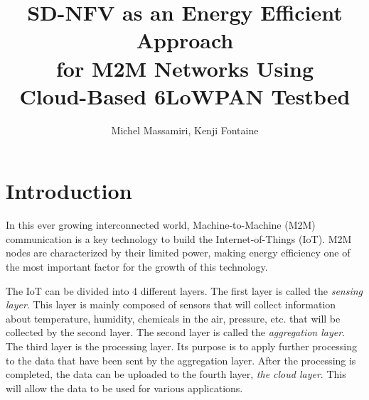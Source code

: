 \documentclass[10pt,journal,compsoc]{IEEEtran}
\begin{document}
%
\title{SD-NFV as an Energy Efficient Approach \\
       for M2M Networks Using \\
       Cloud-Based 6LoWPAN Testbed}

\author{Michel Massamiri,
        Kenji Fontaine}%



\maketitle


\IEEEdisplaynontitleabstractindextext
\IEEEpeerreviewmaketitle



\section{Introduction}\label{sec:introduction}

In this ever growing interconnected world, Machine-to-Machine (M2M) 
communication is a key technology to build the Internet-of-Things (IoT). 
M2M nodes are characterized by their limited power, making energy 
efficiency one of the most important factor for the growth of this 
technology. 

The IoT can be divided into 4 different layers. The first layer is called 
the \textit{sensing layer}. This layer is mainly composed of 
sensors that will collect information about temperature, humidity, 
chemicals in the air, pressure, etc. that will be 
collected by the second layer. The second layer is called the 
\textit{aggregation layer}. The third layer is the processing layer. Its 
purpose is to apply further processing to the data that have been sent by 
the aggregation layer. After the processing is completed, the data can 
be uploaded to the fourth layer, \textit{the cloud layer}. This will 
allow the data to be used for various applications.
\end{document}
